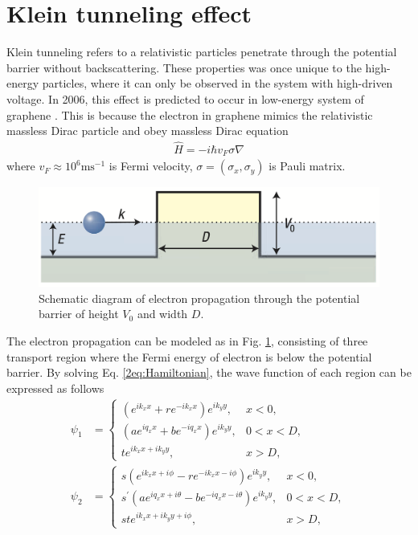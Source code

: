 \section{Klein tunneling effect} \label{2sec:klein effect}
    Klein tunneling refers to a relativistic particles penetrate through the potential barrier without backscattering.
    These properties was once unique to the high-energy particles, where it can only be observed in the system with high-driven voltage.
    In 2006, this effect is predicted to occur in low-energy system of graphene \cite{Katsnelson2006a}.
    This is because the electron in graphene mimics the relativistic massless Dirac particle and obey massless Dirac equation
    \begin{align} \label{2eq:Hamiltonian}
        \hat{H} = -i\hbar v_F \sigma \nabla 
    \end{align}
    where $v_F \approx 10^6 \mathrm{ms^{-1}}$ is Fermi velocity, $\sigma = (\sigma_x, \sigma_y)$ is Pauli matrix. 
    \begin{figure}[H]
        \centering
        \includegraphics[width=0.7\linewidth]{fig/Chap 2/electron propagation.png}
        \caption{Schematic diagram of electron propagation through the potential barrier of height $V_0$ and width $D$.}
        \label{2fig:electron propagation}
    \end{figure}
    The electron propagation can be modeled as in Fig. \ref{2fig:electron propagation}, consisting of three transport region where the Fermi energy of electron is below the potential barrier.
    By solving Eq. \ref{2eq:Hamiltonian}, the wave function of each region can be expressed as follows
    \begin{equation} \label{2eq:wave function}
        \begin{aligned}
            \psi_1 &= \begin{cases} (e^{ik_x x}+re^{-ik_x x})e^{ik_y y}, &x<0,\\
                (ae^{i q_x x}+be^{-i q_x x})e^{ik_y y},  &0<x<D,\\
                te^{ik_x x + ik_y y},  &x>D,
                \end{cases}\\
            \psi_2 &= \begin{cases} s(e^{ik_x x+i \phi}-re^{-ik_x x-i \phi})e^{ik_y y},  &x<0,\\
                s^\prime(ae^{i q_x x+ i \theta}-be^{-i q_x x- i \theta})e^{ik_y y}, &0<x<D,\\
                ste^{ik_x x + ik_y y+ i \phi}, &x>D,
                \end{cases}
        \end{aligned}
    \end{equation}
